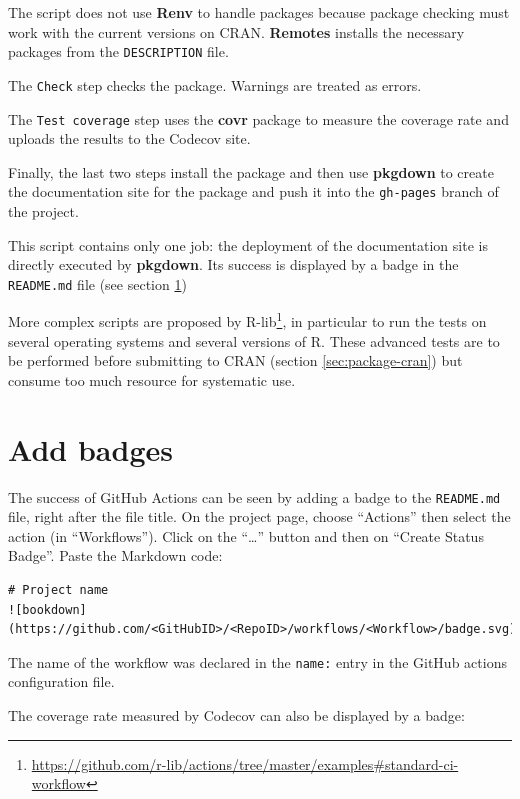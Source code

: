 \documentclass[
  12pt,
  american,
  a4paper,
  extrafontsizes,onecolumn,openright
  ]{memoir}
\newlength{\rf}
\begin{document}
The script does not use \textbf{Renv} to handle packages because package checking must work with the current versions on CRAN.
\textbf{Remotes} installs the necessary packages from the \texttt{DESCRIPTION} file.

The \texttt{Check} step checks the package.
Warnings are treated as errors.

The \texttt{Test\ coverage} step uses the \textbf{covr} package to measure the coverage rate and uploads the results to the Codecov site.

Finally, the last two steps install the package and then use \textbf{pkgdown} to create the documentation site for the package and push it into the \texttt{gh-pages} branch of the project.

This script contains only one job: the deployment of the documentation site is directly executed by \textbf{pkgdown}.
Its success is displayed by a badge in the \texttt{README.md} file (see section \ref{sec:ci-badges})

More complex scripts are proposed by R-lib\footnote{\url{https://github.com/r-lib/actions/tree/master/examples\#standard-ci-workflow}}, in particular to run the tests on several operating systems and several versions of R.
These advanced tests are to be performed before submitting to CRAN (section \ref{sec:package-cran}) but consume too much resource for systematic use.

\hypertarget{sec:ci-badges}{%
\section{Add badges}\label{sec:ci-badges}}

The success of GitHub Actions can be seen by adding a badge to the \texttt{README.md} file, right after the file title.
On the project page, choose \enquote{Actions} then select the action (in \enquote{Workflows}).
Click on the \enquote{\ldots{}} button and then on \enquote{Create Status Badge}.
Paste the Markdown code:

\begin{verbatim}
# Project name
![bookdown](https://github.com/<GitHubID>/<RepoID>/workflows/<Workflow>/badge.svg)
\end{verbatim}

The name of the workflow was declared in the \texttt{name:} entry in the GitHub actions configuration file.

The coverage rate measured by Codecov can also be displayed by a badge:
\end{document}

